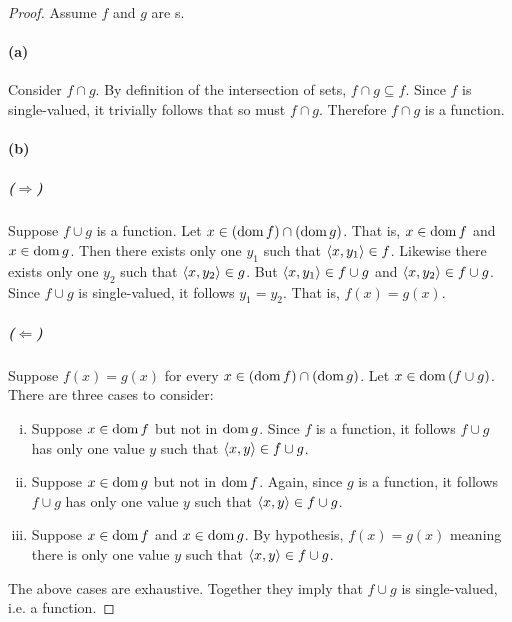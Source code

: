 \documentclass{report}
\begin{document}
  \begin{proof}
    Assume $f$ and $g$ are s.

    \paragraph{(a)}%

      Consider $f \cap g$.
      By definition of the intersection of sets, $f \cap g \subseteq f$.
      Since $f$ is single-valued, it trivially follows that so must $f \cap g$.
      Therefore $f \cap g$ is a function.

    \paragraph{(b)}%

      \subparagraph{($\Rightarrow$)}%

        Suppose $f \cup g$ is a function.
        Let $x \in (\mathop{\text{dom}}{f}) \cap (\mathop{\text{dom}}{g})$.
        That is, $x \in \mathop{\text{dom}}{f}$ and $x \in \mathop{\text{dom}}{g}$.
        Then there exists only one $y_1$ such that $\left< x, y_1 \right> \in f$.
        Likewise there exists only one $y_2$ such that
          $\left< x, y_2 \right> \in g$.
        But $\left< x, y_1 \right> \in f \cup g$ and $\left< x, y_2 \right> \in f \cup g$.
        Since $f \cup g$ is single-valued, it follows $y_1 = y_2$.
        That is, $f(x) = g(x)$.

      \subparagraph{($\Leftarrow$)}%

        Suppose $f(x) = g(x)$ for every $x \in (\mathop{\text{dom}}{f}) \cap (\mathop{\text{dom}}{g})$.
        Let $x \in \mathop{\text{dom}}{(f \cup g)}$.
        There are three cases to consider:

        \begin{enumerate}[(i)]
          \item Suppose $x \in \mathop{\text{dom}}{f}$ but not in $\mathop{\text{dom}}{g}$.
            Since $f$ is a function, it follows $f \cup g$ has only one value $y$
              such that $\left< x, y \right> \in f \cup g$.
          \item Suppose $x \in \mathop{\text{dom}}{g}$ but not in $\mathop{\text{dom}}{f}$.
            Again, since $g$ is a function, it follows $f \cup g$ has only one
              value $y$ such that $\left< x, y \right> \in f \cup g$.
          \item Suppose $x \in \mathop{\text{dom}}{f}$ and $x \in \mathop{\text{dom}}{g}$.
            By hypothesis, $f(x) = g(x)$ meaning there is only one value $y$ such
              that $\left< x, y \right> \in f \cup g$.
        \end{enumerate}

        The above cases are exhaustive.
        Together they imply that $f \cup g$ is single-valued, i.e. a function.

  \end{proof}
\end{document}
